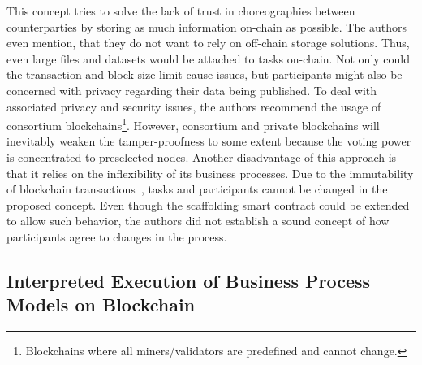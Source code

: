 This concept tries to solve the lack of trust in choreographies between counterparties by storing as much information on-chain as possible. The authors even mention, that they do not want to rely on off-chain storage solutions. Thus, even large files and datasets would be attached to tasks on-chain. Not only could the transaction and block size limit cause issues, but participants might also be concerned with privacy regarding their data being published. To deal with associated privacy and security issues, the authors recommend the usage of consortium blockchains\footnote{Blockchains where all miners/validators are predefined and cannot change.}. However, consortium and private blockchains will inevitably weaken the tamper-proofness to some extent because the voting power is concentrated to preselected nodes. Another disadvantage of this approach is that it relies on the inflexibility of its business processes. Due to the immutability of blockchain transactions~\cite{nakamoto2009}, tasks and participants cannot be changed in the proposed concept. Even though the scaffolding smart contract could be extended to allow such behavior, the authors did not establish a sound concept of how participants agree to changes in the process.


\subsection{Interpreted Execution of Business Process Models on Blockchain~\cite{interpreted_bp_on_blockchain_weber}}

